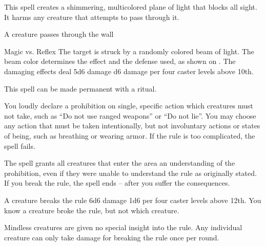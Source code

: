 \begin{spellheader}
    \spelldur{\durshort \dismissable}
\end{spellheader}
\begin{spelleffects}
    \spelleffect This spell creates a shimmering, multicolored plane of light that blocks all sight. It harms any creature that attempts to pass through it.
    \begin{spelltrigger}{A creature passes through the wall}
        \begin{spellattack}{Magic vs. Reflex}
            \spellspecial The target is struck by a randomly colored beam of light. The beam color determines the effect and the defense used, as shown on . The damaging effects deal 5d6 damage \add d6 damage per four caster levels above 10th.
        \end{spellattack}
    \end{spelltrigger}
\end{spelleffects}
\begin{spellfooter}
    \spellnotes This spell can be made permanent with a  ritual.
\end{spellfooter}

\begin{spellheader}
    \spelldur{\durshort}
\end{spellheader}
\begin{spelleffects}
    \spelleffect You loudly declare a prohibition on single, specific action which creatures must not take, such as ``Do not use ranged weapons'' or ``Do not lie''. You may choose any action that must be taken intentionally, but not involuntary actions or states of being, such as breathing or wearing armor. If the rule is too complicated, the spell fails.

    The spell grants all creatures that enter the area an understanding of the prohibition, even if they were unable to understand the rule as originally stated. If you break the rule, the spell ends -- after you suffer the consequences.
    \begin{spelltrigger}{A creature breaks the rule}
        \spelleffect 6d6 damage \add 1d6 per four caster levels above 12th. You know a creature broke the rule, but not which creature.
    \end{spelltrigger}
\end{spelleffects}
\begin{spellfooter}
    \spellnotes Mindless creatures are given no special insight into the rule. Any individual creature can only take damage for breaking the rule once per round.
\end{spellfooter}

